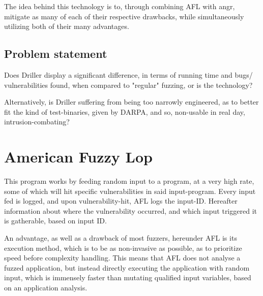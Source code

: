 \documentclass[a4paper]{article}
\begin{document}
The idea behind this technology is to, through combining AFL with angr, mitigate as many of each of their respective drawbacks, while simultaneously utilizing both of their many advantages.
\subsection{Problem statement}
Does Driller display a significant difference, in terms of running time and bugs/ vulnerabilities found, when compared to "regular" fuzzing, or is the technology?

Alternatively, is Driller suffering from being too narrowly engineered, as to better fit the kind of test-binaries, given by DARPA, and so, non-usable in real day, intrusion-combating?
\newpage
\section{American Fuzzy Lop}
This program works by feeding random input to a program, at a very high rate, some of which will hit specific vulnerabilities in said input-program. Every input fed is logged, and upon vulnerability-hit, AFL logs the input-ID. Hereafter information about where the vulnerability occurred, and which input triggered it is gatherable, based on input ID.

An advantage, as well as a drawback of most fuzzers, hereunder AFL is its execution method, which is to be as non-invasive as possible, as to prioritize speed before complexity handling. This means that AFL does not analyse a fuzzed application, but instead directly executing the application with random input, which is immensely faster than mutating qualified input variables, based on an application analysis.
\end{document}
